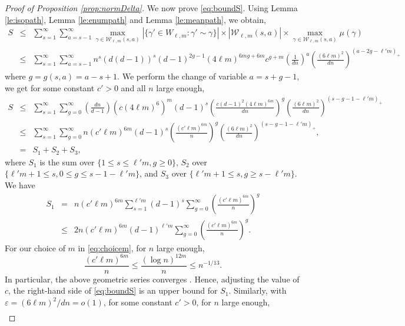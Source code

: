 \documentclass[11pt]{article}
\newcommand{\cW}{\mathcal {W}}
\newcommand{\PAR}[1]{{{\left(#1\right)}}} %
\newcommand{\1}{1\!\!{\sf I}}\newcommand{\IND}{\1}
\newcommand{\veps}{\varepsilon}
\begin{document}
\begin{proof}[Proof of Proposition \ref{prop:normDelta}]
We now prove \eqref{eq:boundS}. Using Lemma \ref{le:isopath}, Lemma \ref{le:enumpath} and Lemma \ref{le:meanpath}, we obtain,
\begin{eqnarray*}
S & \leq & \sum_{s = 1}^\infty \sum_{a = s - 1} ^{\infty} \max_{ \gamma \in \cW_{\ell,m} (s,a)} |\{ \gamma' \in W_{\ell,m} : \gamma' \sim \gamma \} | \times  |\cW_{\ell,m} (s,a) | \times  \max_{ \gamma \in \cW_{\ell,m} (s,a)} \mu(\gamma)  \\
& \leq &  \sum_{s=1}^{\infty} \sum_{a = s - 1} ^{\infty} n^s ( d (d-1) ) ^{s } (d-1)^{2g -1}  (4 \ell  m )^{6 m g + 6 m}  c^{g + m} \PAR{\frac{ 1 }{dn} }^a  \PAR{\frac{ (6\ell m)^2 }{dn} } ^{  (a - 2g - \ell ' m)_+} 
 \end{eqnarray*}
where $g = g(s,a) = a - s+ 1$. We perform the change of variable $a = s + g -1$, we get for some constant $c' >0$ and all $n$ large enough, 
\begin{eqnarray*}
S & \leq &   \sum_{s=1}^{\infty} \sum_{g=0} ^{\infty} \PAR{\frac{dn}{d-1}} \PAR{ c (4 \ell m)^6}^m  \PAR{d-1}^{s }\PAR{ \frac{ c (d-1)^{2}  (4 \ell  m )^{6m} }{dn}}^g    \PAR{\frac{ (6\ell m)^2 }{dn} } ^{  (s - g - 1 -  \ell ' m)_+}\\
& \leq & \sum_{s=1}^{\infty} \sum_{g=0} ^{\infty} n  (c'  \ell  m)^{6 m}    (d-1)^{s}  \PAR{\frac{ (c' \ell m) ^{6m} }{ n } }^{g} \PAR{\frac{ (6\ell m)^2 }{dn} } ^{  (s - g - 1 -  \ell ' m)_+},\\
& = &  S_1 + S_2 + S_3, 
 \end{eqnarray*}
where $S_1$ is the sum over $\{ 1 \leq s \leq \ell'm, g \geq 0 \}$, $S_2$ over $\{\ell' m+1 \leq s , 0 \leq g \leq s - 1 - \ell' m \}$, and $S_3$ over $\{ \ell' m+1 \leq s , g \geq s - \ell' m\}$. We have 
\begin{eqnarray*}
S_1 & = &  n  (c'  \ell  m)^{6 m}   \sum_{s=1}^{ \ell' m} (d-1)^{s} \sum_{g=0} ^{ \infty } \PAR{\frac{ (c' \ell m) ^{6m} }{ n } }^{g} \\
& \leq & 2 n (c'  \ell  m )^{6 m}  (d-1)^{\ell'm}   \sum_{g = 0} ^{ \infty } \PAR{\frac{  (c' \ell m )^{6m} }{ n } }^{g}.
\end{eqnarray*}
For our choice of $m$ in \eqref{eq:choicem}, for $n$ large enough, 
$$
\frac{   (c' \ell m) ^{6m} }{ n } \leq \frac{( \log n )^{12m} }{n} \leq n^{-1/13}. 
$$
In particular, the above geometric series converges . Hence, adjusting the value of $c$,  the right-hand side of \eqref{eq:boundS} is an upper bound for $S_1$. Similarly, with $\veps =   (6 \ell m)^2  / dn    = o(1)$, for some constant $c ' >0$, for $n$ large enough, 
\begin{eqnarray*}

\end{eqnarray*}
\end{proof}
\end{document}
